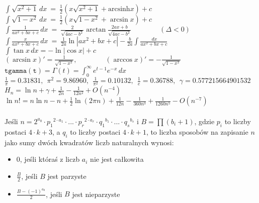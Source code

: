 
\usepackage[utf8]{inputenc}
\usepackage{polski}
\usepackage{amsfonts}
\usepackage{amsmath,amssymb}

\DeclareMathOperator{\sech}{sech}
\DeclareMathOperator{\csch}{csch}
\DeclareMathOperator{\arcsec}{arcsec}
\DeclareMathOperator{\arccsc}{arcCsc}
\DeclareMathOperator{\arccosh}{arcCosh}
\DeclareMathOperator{\arcsinh}{arcsinh}
\DeclareMathOperator{\arctanh}{arctanh}
\DeclareMathOperator{\arcsech}{arcsech}
\DeclareMathOperator{\arccsch}{arcCsch}
\DeclareMathOperator{\arccoth}{arcCoth} 

  \( \int \sqrt{x^2 + 1} \,dx\ =\ \frac12 \left( x\sqrt{x^2 + 1} + \text{arcsinh} x \right) + c\) 
  \( \int \sqrt{1 - x^2} \,dx\ =\ \frac12 \left( x\sqrt{1 - x^2} + \arcsin x \right) + c\) \\
  \( \int \frac{1}{ax^2 + bx + c} \,dx\ =\ \frac{2}{\sqrt{4ac - b^2}} \arctan
      \frac{2ax + b}{\sqrt{4ac - b^2}} \qquad \qquad (\Delta < 0)\) \\
  \( \int \frac{x}{ax^2 + bx + c} \,dx\ =\ \frac{1}{2a} \ln |ax^2 + bx + c|
      - \frac{b}{2a} \int \frac{\,dx}{ax^2 + bx + c} \) \\
  \( \int \tan x \,dx = - \ln |\cos x| + c \) \\
  \( (\arcsin x)' = \frac{1}{\sqrt{1 - x^2}}, \qquad \qquad
     (\arccos x)' = -\frac{1}{\sqrt{1 - x^2}} \) \\
  \( \mathtt{tgamma(t)} = \Gamma(t) = \int_0^{\infty} e^{t-1} e^{-x} \,dx \) \\
  \( \frac1{\pi} = 0.31831,\ \ \pi^2 = 9.86960,\ \ \frac1{\pi^2} = 0.10132,\ \ \frac1e = 0.36788,
  \ \ \gamma = 0.577215664901532\) \\
  \( H_n = \ln n + \gamma + \frac1{2n} - \frac1{12n^2} + O(n^{-4}) \) \\
  \( \ln n! = n \ln n - n + \frac12 \ln(2 \pi n) + \frac1{12n} - \frac1{360n^3} + \frac1{1260n^5}
  - O(n^{-7}) \)
  \\ 
  \\
	Jeśli $n=2^{a_0} \cdot {p_1}^{2 \cdot a_1} \cdot ... \cdot {p_r}^{2 \cdot a_r} \cdot {q_1}^{b_1} \cdot ... \cdot {q_s}^{b_s}$ i $B= \prod (b_i+1)$, gdzie $p_i$ to liczby postaci $4 \cdot k + 3$, a $q_i$ to liczby postaci $4 \cdot k + 1$, to liczba sposobów na zapisanie $n$ jako sumy dwóch kwadratów liczb naturalnych wynosi:
      \begin{itemize}
        \item 0, jeśli któraś z liczb $a_i$ nie jest całkowita
        \item $\frac{B}{2}$, jeśli $B$ jest parzyste
        \item $\frac{B-(-1)^{a_0}}{2}$, jeśli $B$ jest nieparzyste
      \end{itemize}
      
